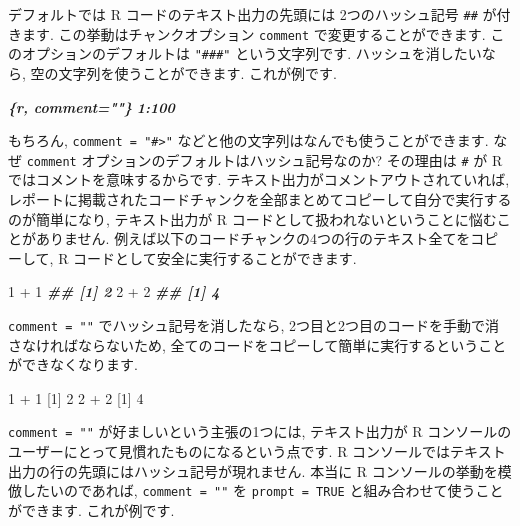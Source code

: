 \documentclass[
  11pt,
  lualatex,
  ja=standard]{bxjsreport}
\newenvironment{Shaded}{\begin{snugshade}}{\end{snugshade}}
\newcommand{\DecValTok}[1]{\textcolor[rgb]{0.00,0.00,0.81}{#1}}
\newcommand{\DocumentationTok}[1]{\textcolor[rgb]{0.56,0.35,0.01}{\textbf{\textit{#1}}}}
\newcommand{\InformationTok}[1]{\textcolor[rgb]{0.56,0.35,0.01}{\textbf{\textit{#1}}}}
\newcommand{\NormalTok}[1]{#1}
\newcommand{\SpecialCharTok}[1]{\textcolor[rgb]{0.00,0.00,0.00}{#1}}
\begin{document}
デフォルトでは R コードのテキスト出力の先頭には 2つのハッシュ記号 \texttt{\#\#} が付きます. この挙動はチャンクオプション \texttt{comment} で変更することができます. このオプションのデフォルトは \texttt{"\#\#\#"} という文字列です. ハッシュを消したいなら, 空の文字列を使うことができます. これが例です.

\begin{Shaded}
\begin{Highlighting}[]
\InformationTok{\textasciigrave{}\textasciigrave{}\textasciigrave{}\{r, comment=""\}}
\InformationTok{1:100}
\InformationTok{\textasciigrave{}\textasciigrave{}\textasciigrave{}}
\end{Highlighting}
\end{Shaded}

もちろん, \texttt{comment = "\#\textgreater{}"} などと他の文字列はなんでも使うことができます. なぜ \texttt{comment} オプションのデフォルトはハッシュ記号なのか? その理由は \texttt{\#} が R ではコメントを意味するからです. テキスト出力がコメントアウトされていれば, レポートに掲載されたコードチャンクを全部まとめてコピーして自分で実行するのが簡単になり, テキスト出力が R コードとして扱われないということに悩むことがありません. 例えば以下のコードチャンクの4つの行のテキスト全てをコピーして, R コードとして安全に実行することができます.

\begin{Shaded}
\begin{Highlighting}[numbers=left,,]
\DecValTok{1} \SpecialCharTok{+} \DecValTok{1}
\DocumentationTok{\#\# [1] 2}
\DecValTok{2} \SpecialCharTok{+} \DecValTok{2}
\DocumentationTok{\#\# [1] 4}
\end{Highlighting}
\end{Shaded}

\texttt{comment = ""} でハッシュ記号を消したなら, 2つ目と2つ目のコードを手動で消さなければならないため, 全てのコードをコピーして簡単に実行するということができなくなります.

\begin{Shaded}
\begin{Highlighting}[numbers=left,,]
\DecValTok{1} \SpecialCharTok{+} \DecValTok{1}
\NormalTok{[}\DecValTok{1}\NormalTok{] }\DecValTok{2}
\DecValTok{2} \SpecialCharTok{+} \DecValTok{2}
\NormalTok{[}\DecValTok{1}\NormalTok{] }\DecValTok{4}
\end{Highlighting}
\end{Shaded}

\texttt{comment = ""} が好ましいという主張の1つには, テキスト出力が R コンソールのユーザーにとって見慣れたものになるという点です. R コンソールではテキスト出力の行の先頭にはハッシュ記号が現れません. 本当に R コンソールの挙動を模倣したいのであれば, \texttt{comment = ""} を \texttt{prompt = TRUE} と組み合わせて使うことができます. これが例です.
\end{document}

